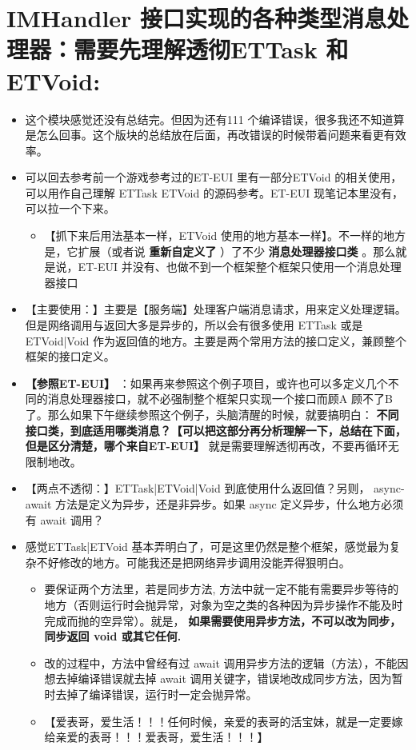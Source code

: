 \documentclass[9pt, b5paper]{article}
\begin{document}
\section{IMHandler 接口实现的各种类型消息处理器：需要先理解透彻ETTask 和 ETVoid:}
\label{sec-11}
\begin{itemize}
\item 这个模块感觉还没有总结完。但因为还有111 个编译错误，很多我还不知道算是怎么回事。这个版块的总结放在后面，再改错误的时候带着问题来看更有效率。
\item 可以回去参考前一个游戏参考过的ET-EUI 里有一部分ETVoid 的相关使用，可以用作自己理解 ETTask ETVoid 的源码参考。ET-EUI 现笔记本里没有，可以拉一个下来。
\begin{itemize}
\item 【抓下来后用法基本一样，ETVoid 使用的地方基本一样】。不一样的地方是，它扩展（或者说 \textbf{重新自定义了} ）了不少 \textbf{消息处理器接口类} 。那么就是说，ET-EUI 并没有、也做不到一个框架整个框架只使用一个消息处理器接口
\end{itemize}
\item 【主要使用：】主要是【服务端】处理客户端消息请求，用来定义处理逻辑。但是网络调用与返回大多是异步的，所以会有很多使用 ETTask 或是 ETVoid|Void 作为返回值的地方。主要是两个常用方法的接口定义，兼顾整个框架的接口定义。
\item \textbf{【参照ET-EUI】} ：如果再来参照这个例子项目，或许也可以多定义几个不同的消息处理器接口，就不必强制整个框架只实现一个接口而顾A 顾不了B 了。那么如果下午继续参照这个例子，头脑清醒的时候，就要搞明白： \textbf{不同接口类，到底适用哪类消息？【可以把这部分再分析理解一下，总结在下面，但是区分清楚，哪个来自ET-EUI】} 就是需要理解透彻再改，不要再循环无限制地改。
\item 【两点不透彻：】ETTask|ETVoid|Void 到底使用什么返回值？另则， async-await 方法是定义为异步，还是非异步。如果 async 定义异步，什么地方必须有 await 调用？
\item 感觉ETTask|ETVoid 基本弄明白了，可是这里仍然是整个框架，感觉最为复杂不好修改的地方。可能我还是把网络异步调用没能弄得狠明白。
\begin{itemize}
\item 要保证两个方法里，若是同步方法, 方法中就一定不能有需要异步等待的地方（否则运行时会抛异常，对象为空之类的各种因为异步操作不能及时完成而抛的空异常）。就是， \textbf{如果需要使用异步方法，不可以改为同步，同步返回 void 或其它任何.}
\item 改的过程中，方法中曾经有过 await 调用异步方法的逻辑（方法），不能因想去掉编译错误就去掉 await 调用关键字，错误地改成同步方法，因为暂时去掉了编译错误，运行时一定会抛异常。
\item 【爱表哥，爱生活！！！任何时候，亲爱的表哥的活宝妹，就是一定要嫁给亲爱的表哥！！！爱表哥，爱生活！！！】
\end{itemize}
\end{itemize}
\end{document}

